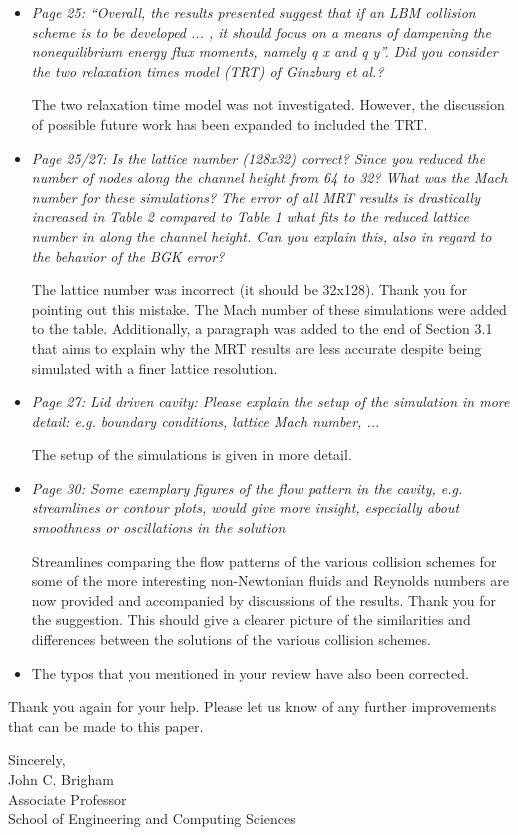 \documentclass{article}
\begin{document}
\begin{itemize}
	\item \emph{Page 25: ``Overall, the results presented suggest that if an LBM collision scheme is to
		be developed ... , it should focus on a means of dampening the nonequilibrium
		energy flux moments, namely q x and q y''. Did you consider the two relaxation times
		model (TRT) of Ginzburg et al.?}
	
	The two relaxation time model was not investigated. However, the discussion of possible future work has been expanded to included the TRT.
	
	\item \emph{Page 25/27: Is the lattice number (128x32) correct? Since you reduced the number
		of nodes along the channel height from 64 to 32? What was the Mach number for
		these simulations? The error of all MRT results is drastically increased in Table 2
		compared to Table 1 what fits to the reduced lattice number in along the channel
		height. Can you explain this, also in regard to the behavior of the BGK error?}
	
	The lattice number was incorrect (it should be 32x128).
	Thank you for pointing out this mistake.
	The Mach number of these simulations were added to the table.
	Additionally, a paragraph was added to the end of Section 3.1 that aims to explain why the MRT results are less accurate despite being simulated with a finer lattice resolution.
	
	\item \emph{Page 27: Lid driven cavity: Please explain the setup of the simulation in more detail:
		e.g. boundary conditions, lattice Mach number, ...}
	
	The setup of the simulations is given in more detail.
	
	\item \emph{Page 30: Some exemplary figures of the flow pattern in the cavity, e.g. streamlines or
		contour plots, would give more insight, especially about smoothness or oscillations in
		the solution}
	
	Streamlines comparing the flow patterns of the various collision schemes for some of the more interesting non-Newtonian fluids and Reynolds numbers are now provided and accompanied by discussions of the results.
	Thank you for the suggestion.
	This should give a clearer picture of the similarities and differences between the solutions of the various collision schemes.
	
	\item The typos that you mentioned in your review have also been corrected.
	
	\end{itemize}

Thank you again for your help. Please let us know of any further improvements that can be made to this paper.

\vspace{6in}
\noindent Sincerely, \\
\indent John C. Brigham \vspace{0.1in}\\
\indent Associate Professor \\
\indent School of Engineering and Computing Sciences
	
\end{document}
